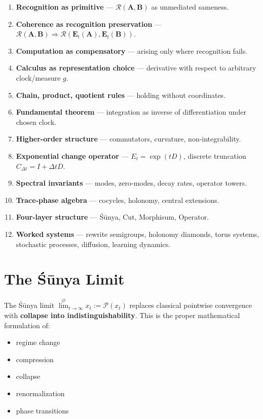 \documentclass[12pt, oneside]{article}
\newcommand{\R}{\mathcal{R}}
\begin{document}
\begin{enumerate}
    \item \textbf{Recognition as primitive} — $\R(\mathbf{A},\mathbf{B})$ as unmediated sameness.
    \item \textbf{Coherence as recognition preservation} — $\R(\mathbf{A},\mathbf{B}) \Rightarrow \R(\mathbf{E}_t(\mathbf{A}),\mathbf{E}_t(\mathbf{B}))$.
    \item \textbf{Computation as compensatory} — arising only where recognition fails.
    \item \textbf{Calculus as representation choice} — derivative with respect to arbitrary clock/measure $g$.
    \item \textbf{Chain, product, quotient rules} — holding without coordinates.
    \item \textbf{Fundamental theorem} — integration as inverse of differentiation under chosen clock.
    \item \textbf{Higher-order structure} — commutators, curvature, non-integrability.
    \item \textbf{Exponential change operator} — $E_t = \exp(tD)$, discrete truncation $C_{\Delta t} = I + \Delta t D$.
    \item \textbf{Spectral invariants} — modes, zero-modes, decay rates, operator towers.
    \item \textbf{Trace-phase algebra} — cocycles, holonomy, central extensions.
    \item \textbf{Four-layer structure} — Śūnya, Cut, Morphisum, Operator.
    \item \textbf{Worked systems} — rewrite semigroups, holonomy diamonds, torus systems, stochastic processes, diffusion, learning dynamics.
\end{enumerate}

\section{The Śūnya Limit}

The Śūnya limit $\overset{\varnothing}{\lim}_{t \to \infty} x_t := \mathcal{P}(x_t)$ replaces classical pointwise convergence with \textbf{collapse into indistinguishability}. This is the proper mathematical formulation of:
\begin{itemize}
    \item regime change
    \item compression
    \item collapse
    \item renormalization
    \item phase transitions
\end{itemize}
\end{document}
